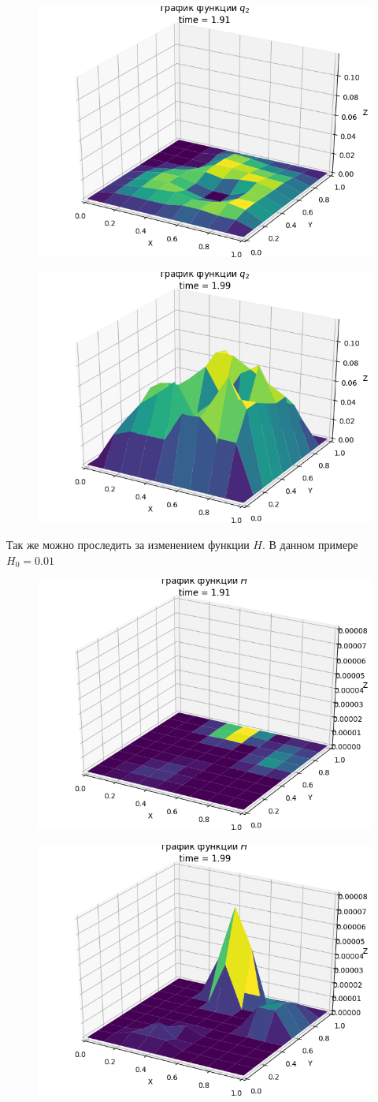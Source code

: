 \documentclass[14pt]{extreport}
\begin{document}
\begin{figure}[H]
\centerline{
\includegraphics[width=0.5\linewidth]{images/ex3/q_2/91}}
\caption{}
\label{img:ex3:q2:91}
\end{figure}

\begin{figure}[H]
\centerline{
\includegraphics[width=0.5\linewidth]{images/ex3/q_2/99}}
\caption{}
\label{img:ex3:q2:99}
\end{figure}

Так же можно проследить за изменением функции $H$. В данном примере $H_0=0.01$

\begin{figure}[H]
\centerline{
\includegraphics[width=0.5\linewidth]{images/ex3/H/91}}
\caption{}
\label{img:ex3:H:91}
\end{figure}

\begin{figure}[H]
\centerline{
\includegraphics[width=0.5\linewidth]{images/ex3/H/99}}
\caption{}
\label{img:ex3:H:99}
\end{figure}
\end{document}

